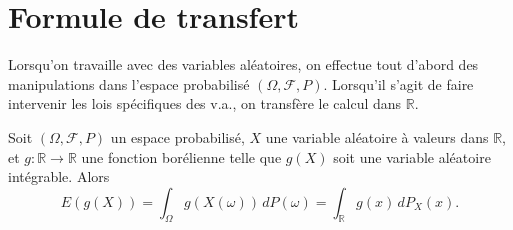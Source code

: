 \section{Formule de transfert}
Lorsqu'on travaille avec des variables aléatoires, on effectue tout d'abord des manipulations dans l'espace probabilisé $(\Omega, \mathcal{F}, P)$. Lorsqu'il s'agit de faire intervenir les lois spécifiques des v.a., on transfère le calcul dans $\mathbb{R}$.
\begin{proposition}
Soit $(\Omega, \mathcal{F}, P)$ un espace probabilisé, $X$ une variable aléatoire à valeurs dans $\mathbb{R}$, et $g: \mathbb{R} \to \mathbb{R}$ une fonction borélienne telle que $g(X)$ soit une variable aléatoire intégrable. Alors
\[ E(g(X)) = \int_{\Omega} g(X(\omega)) \,dP(\omega) = \int_{\mathbb{R}} g(x) \,dP_X(x). \]
\end{proposition}

